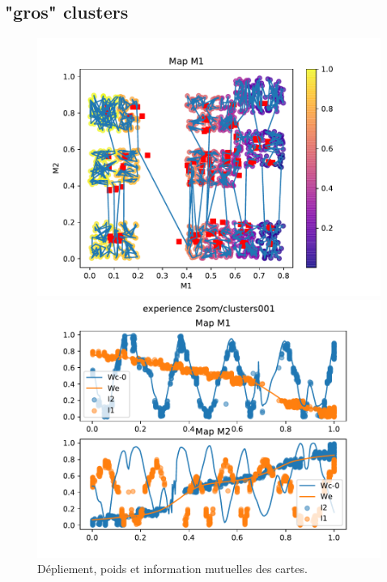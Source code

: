 \subsection{"gros" clusters}

\begin{figure}[h!]
\begin{minipage}{0.33\textwidth}
\centering\includegraphics[width=\textwidth]{2som_cluster001_din}
\end{minipage}
\begin{minipage}{0.33\textwidth}
\centering\includegraphics[width=\textwidth]{2som_cluster001_w}
\end{minipage}
\begin{minipage}{0.33\textwidth}
\end{minipage}
\caption{Dépliement, poids et information mutuelles des cartes. }
\label{fig:cluster001}
\end{figure}



